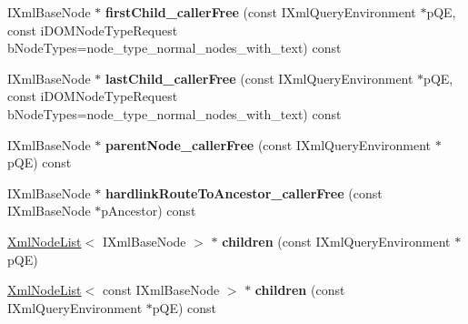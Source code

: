 \begin{DoxyCompactItemize}
\item 
\hypertarget{classgeneral__server_1_1LibXmlBaseNode_a4f049419e3c577d193c1f80f93114548}{\-I\-Xml\-Base\-Node $\ast$ {\bfseries first\-Child\-\_\-caller\-Free} (const \-I\-Xml\-Query\-Environment $\ast$p\-Q\-E, const i\-D\-O\-M\-Node\-Type\-Request b\-Node\-Types=node\-\_\-type\-\_\-normal\-\_\-nodes\-\_\-with\-\_\-text) const }\label{classgeneral__server_1_1LibXmlBaseNode_a4f049419e3c577d193c1f80f93114548}

\item 
\hypertarget{classgeneral__server_1_1LibXmlBaseNode_a8f3c8cffdc7ede7d4b9b7ed320cec727}{\-I\-Xml\-Base\-Node $\ast$ {\bfseries last\-Child\-\_\-caller\-Free} (const \-I\-Xml\-Query\-Environment $\ast$p\-Q\-E, const i\-D\-O\-M\-Node\-Type\-Request b\-Node\-Types=node\-\_\-type\-\_\-normal\-\_\-nodes\-\_\-with\-\_\-text) const }\label{classgeneral__server_1_1LibXmlBaseNode_a8f3c8cffdc7ede7d4b9b7ed320cec727}

\item 
\hypertarget{classgeneral__server_1_1LibXmlBaseNode_a01cfeb7a3d30b7fe75cadb98260b149f}{\-I\-Xml\-Base\-Node $\ast$ {\bfseries parent\-Node\-\_\-caller\-Free} (const \-I\-Xml\-Query\-Environment $\ast$p\-Q\-E) const }\label{classgeneral__server_1_1LibXmlBaseNode_a01cfeb7a3d30b7fe75cadb98260b149f}

\item 
\hypertarget{classgeneral__server_1_1LibXmlBaseNode_a6d42393f51628fe71daf39d1c55e748b}{\-I\-Xml\-Base\-Node $\ast$ {\bfseries hardlink\-Route\-To\-Ancestor\-\_\-caller\-Free} (const \-I\-Xml\-Base\-Node $\ast$p\-Ancestor) const }\label{classgeneral__server_1_1LibXmlBaseNode_a6d42393f51628fe71daf39d1c55e748b}

\item 
\hypertarget{classgeneral__server_1_1LibXmlBaseNode_a619e0246d89e661aed529623fd739ed8}{\hyperlink{classgeneral__server_1_1XmlNodeList}{\-Xml\-Node\-List}$<$ \-I\-Xml\-Base\-Node $>$ $\ast$ {\bfseries children} (const \-I\-Xml\-Query\-Environment $\ast$p\-Q\-E)}\label{classgeneral__server_1_1LibXmlBaseNode_a619e0246d89e661aed529623fd739ed8}

\item 
\hypertarget{classgeneral__server_1_1LibXmlBaseNode_a19037e45bf9a841850be9ddfd48aaa4d}{\hyperlink{classgeneral__server_1_1XmlNodeList}{\-Xml\-Node\-List}$<$ const \-I\-Xml\-Base\-Node $>$ $\ast$ {\bfseries children} (const \-I\-Xml\-Query\-Environment $\ast$p\-Q\-E) const }\label{classgeneral__server_1_1LibXmlBaseNode_a19037e45bf9a841850be9ddfd48aaa4d}


\end{DoxyCompactItemize}
